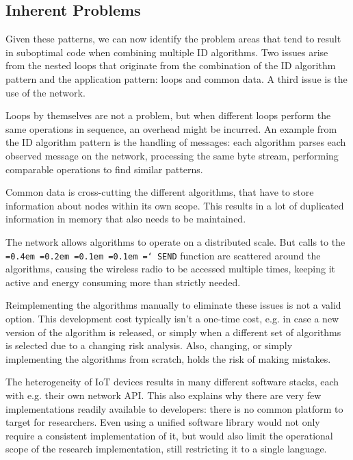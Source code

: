 \documentclass[conference]{IEEEtran}
\newcommand*\justify{%
  \fontdimen2\font=0.4em%
  \fontdimen3\font=0.2em%
  \fontdimen4\font=0.1em%
  \fontdimen7\font=0.1em%
  \hyphenchar\font=`\-%
}
\newcommand{\ttt}[1]{\texttt{\justify{#1}}}
\begin{document}
\subsection*{Inherent Problems}
\label{pattern-problems}

Given these patterns, we can now identify the problem areas that tend to result
in suboptimal code when combining multiple ID algorithms. Two issues arise from
the nested loops that originate from the combination of the ID algorithm
pattern and the application pattern: loops and common data. A third issue is
the use of the network.

\begin{LaTeXdescription}

  \item[Loops] by themselves are not a problem, but when different loops
  perform the same operations in sequence, an overhead might be incurred. An
  example from the ID algorithm pattern is the handling of messages: each
  algorithm parses each observed message on the network, processing the same
  byte stream, performing comparable operations to find similar patterns.

  \item[Common data] is cross-cutting the different algorithms, that have to
  store information about nodes within its own scope. This results in a lot of
  duplicated information in memory that also needs to be maintained.

  \item[The network] allows algorithms to operate on a distributed scale. But
  calls to the \ttt{SEND} function are scattered around the algorithms, causing
  the wireless radio to be accessed multiple times, keeping it active and
  energy consuming more than strictly needed.

\end{LaTeXdescription}

Reimplementing the algorithms manually to eliminate these issues is not a valid
option. This development cost typically isn't a one-time cost, e.g. in case a
new version of the algorithm is released, or simply when a different set of
algorithms is selected due to a changing risk analysis. Also, changing, or
simply implementing the algorithms from scratch, holds the risk of making
mistakes.

The heterogeneity of IoT devices results in many different software stacks,
each with e.g. their own network API. This also explains why there are very few
implementations readily available to developers: there is no common platform to
target for researchers. Even using a unified software library would not only
require a consistent implementation of it, but would also limit the operational
scope of the research implementation, still restricting it to a single language.
\end{document}
